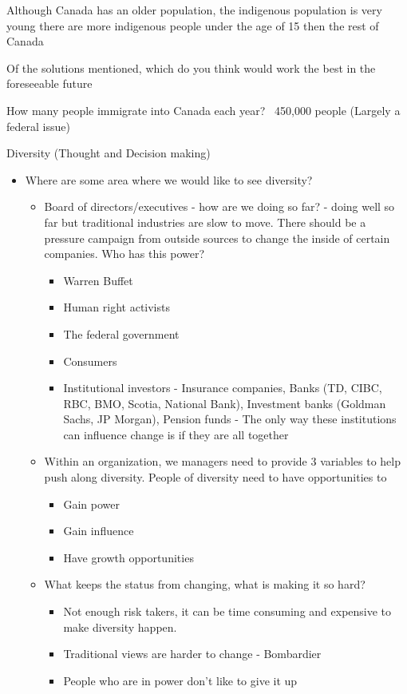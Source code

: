 \documentclass[11pt]{article}
\begin{document}
Although Canada has an older population, the indigenous population is very young there are more indigenous people under the age of 15 then the rest of Canada

Of the solutions mentioned, which do you think would work the best in the foreseeable future

How many people immigrate into Canada each year? ~450,000 people (Largely a federal issue)

Diversity (Thought and Decision making)

\begin{itemize}
    \item Where are some area where we would like to see diversity?
    \begin{itemize}
        \item Board of directors/executives - how are we doing so far? - doing well so far but traditional industries are slow to move. There should be a pressure campaign from outside sources to change the inside of certain companies. Who has this power?
        \begin{itemize}
            \item Warren Buffet
            \item Human right activists
            \item The federal government
            \item Consumers
            \item Institutional investors - Insurance companies, Banks (TD, CIBC, RBC, BMO, Scotia, National Bank), Investment banks (Goldman Sachs, JP Morgan), Pension funds - The only way these institutions can influence change is if they are all together
        \end{itemize}
        \item Within an organization, we managers need to provide 3 variables to help push along diversity. People of diversity need to have opportunities to
        \begin{itemize}
            \item Gain power
            \item Gain influence
            \item Have growth opportunities
        \end{itemize}
        \item What keeps the status from changing, what is making it so hard?
        \begin{itemize}
            \item Not enough risk takers, it can be time consuming and expensive to make diversity happen.
            \item Traditional views are harder to change - Bombardier
            \item People who are in power don't like to give it up
        \end{itemize}
    \end{itemize}
\end{itemize}
\end{document}

